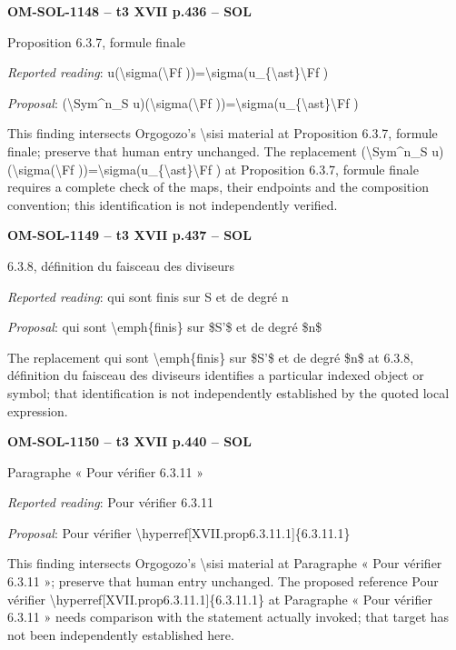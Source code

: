 \par\noindent\textbf{OM-SOL-1148 -- t3 XVII p.436 -- SOL}\par
Proposition 6.3.7, formule finale\par
\emph{Reported reading}: u(\textbackslash{}sigma(\textbackslash{}Ff ))=\allowbreak \textbackslash{}sigma(u\_\{\textbackslash{}ast\}\textbackslash{}Ff )\par
\emph{Proposal}: (\textbackslash{}Sym\textasciicircum{}n\_S u)(\textbackslash{}sigma(\textbackslash{}Ff ))=\allowbreak \textbackslash{}sigma(u\_\{\textbackslash{}ast\}\textbackslash{}Ff )\par
This finding intersects Orgogozo's \textbackslash{}sisi material at Proposition 6.3.7, formule finale; preserve that human entry unchanged. The replacement (\textbackslash{}Sym\textasciicircum{}n\_S u)(\textbackslash{}sigma(\textbackslash{}Ff ))=\allowbreak \textbackslash{}sigma(u\_\{\textbackslash{}ast\}\textbackslash{}Ff ) at Proposition 6.3.7, formule finale requires a complete check of the maps, their endpoints and the composition convention; this identification is not independently verified.\par
\par\noindent\textbf{OM-SOL-1149 -- t3 XVII p.437 -- SOL}\par
6.3.8, définition du faisceau des diviseurs\par
\emph{Reported reading}: qui sont finis sur S et de degré n\par
\emph{Proposal}: qui sont \textbackslash{}emph\{finis\} sur \$S'\$ et de degré \$n\$\par
The replacement qui sont \textbackslash{}emph\{finis\} sur \$S'\$ et de degré \$n\$ at 6.3.8, définition du faisceau des diviseurs identifies a particular indexed object or symbol; that identification is not independently established by the quoted local expression.\par
\par\noindent\textbf{OM-SOL-1150 -- t3 XVII p.440 -- SOL}\par
Paragraphe « Pour vérifier 6.3.11 »\par
\emph{Reported reading}: Pour vérifier 6.3.11\par
\emph{Proposal}: Pour vérifier \textbackslash{}hyperref[XVII.prop6.3.11.1]\{6.3.11.1\}\par
This finding intersects Orgogozo's \textbackslash{}sisi material at Paragraphe « Pour vérifier 6.3.11 »; preserve that human entry unchanged. The proposed reference Pour vérifier \textbackslash{}hyperref[XVII.prop6.3.11.1]\{6.3.11.1\} at Paragraphe « Pour vérifier 6.3.11 » needs comparison with the statement actually invoked; that target has not been independently established here.\par
